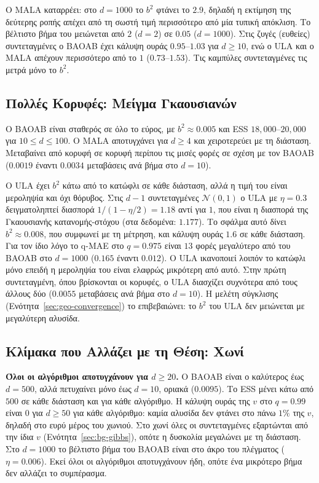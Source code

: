 Ο MALA καταρρέει: στο $d=1000$ το $b^2$ φτάνει το $2.9$, δηλαδή η εκτίμηση της
δεύτερης ροπής απέχει από τη σωστή τιμή περισσότερο από μία τυπική απόκλιση. Το
βέλτιστο βήμα του μειώνεται από $2$ ($d=2$) σε $0.05$ ($d=1000$). Στις ζυγές
(ευθείες) συντεταγμένες ο BAOAB έχει κάλυψη ουράς $0.95$--$1.03$ για $d \ge 10$, ενώ
ο ULA και ο MALA απέχουν περισσότερο από το $1$ ($0.73$--$1.53$). Τις καμπύλες
συντεταγμένες τις μετρά μόνο το $b^2$.

\subsection{Πολλές Κορυφές: Μείγμα Γκαουσιανών}
\label{sec:geo-mixture}

Ο BAOAB είναι σταθερός σε όλο το εύρος, με $b^2 \approx 0.005$ και ESS
$18{,}000$--$20{,}000$ για $10 \le d \le 100$. Ο MALA αποτυγχάνει για $d \ge 4$ και
χειροτερεύει με τη διάσταση. Μεταβαίνει από κορυφή σε κορυφή περίπου τις μισές φορές σε σχέση με
τον BAOAB ($0.0019$ έναντι $0.0034$ μεταβάσεις ανά βήμα στο $d=10$).

Ο ULA έχει $b^2$ κάτω από το κατώφλι σε κάθε διάσταση, αλλά η τιμή του είναι
μεροληψία και όχι θόρυβος. Στις $d-1$ συντεταγμένες $\mathcal{N}(0,1)$ ο ULA με
$\eta = 0.3$ δειγματοληπτεί διασπορά $1/(1-\eta/2) = 1.18$ αντί για $1$, που είναι η διασπορά της
Γκαουσιανής κατανομής-στόχου (στα δεδομένα: $1.177$). Το σφάλμα αυτό δίνει
$b^2 \approx 0.008$, που συμφωνεί με τη μέτρηση, και κάλυψη ουράς $1.6$ σε κάθε διάσταση.
Για τον ίδιο λόγο το q-MAE στο $q=0.975$ είναι $13$ φορές μεγαλύτερο από του BAOAB
στο $d=1000$ ($0.165$ έναντι $0.012$). Ο ULA ικανοποιεί λοιπόν το κατώφλι μόνο επειδή η μεροληψία
του είναι ελαφρώς μικρότερη από αυτό. Στην πρώτη συντεταγμένη, όπου βρίσκονται οι
κορυφές, ο ULA διασχίζει συχνότερα από τους άλλους δύο ($0.0055$ μεταβάσεις ανά
βήμα στο $d=10$). Η μελέτη σύγκλισης (Ενότητα~\ref{sec:geo-convergence}) το
επιβεβαιώνει: το $b^2$ του ULA δεν μειώνεται με μεγαλύτερη αλυσίδα.

\subsection{Κλίμακα που Αλλάζει με τη Θέση: Χωνί}
\label{sec:geo-funnel}

\textbf{Όλοι οι αλγόριθμοι αποτυγχάνουν για $d \ge 20$.} Ο BAOAB είναι ο καλύτερος
έως $d=500$, αλλά πετυχαίνει μόνο έως $d=10$, οριακά ($0.0095$). Το ESS μένει κάτω από
$500$ σε κάθε διάσταση και για κάθε αλγόριθμο. Η κάλυψη ουράς της $v$ στο $q=0.99$
είναι $0$ για $d \ge 50$ για κάθε αλγόριθμο: καμία αλυσίδα δεν φτάνει στο πάνω
$1\%$ της $v$, δηλαδή στο ευρύ μέρος του χωνιού. Στο χωνί όλες οι συντεταγμένες
εξαρτώνται από την ίδια $v$ (Ενότητα~\ref{sec:bg-gibbs}), οπότε η δυσκολία
μεγαλώνει με τη διάσταση. Στο $d=1000$ το βέλτιστο βήμα του BAOAB είναι στο άκρο του
πλέγματος ($\eta = 0.006$). Εκεί όλοι οι αλγόριθμοι αποτυγχάνουν ήδη, οπότε ένα
μικρότερο βήμα δεν αλλάζει το συμπέρασμα.


